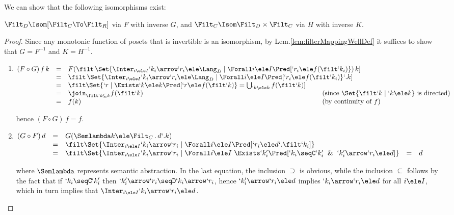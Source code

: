 \documentclass{lmcs}
\begin{document}
We can show that the following isomorphisms exist: 

 \begin{thm} \label{iso-theorem}
$\Filt_D \Isom [\Filt_C\To\Filt_R]$ via $F$ with inverse $G$, and $\Filt_C \Isom \Filt_D \times \Filt_C$ via $H$ with inverse $K$.
 \end{thm}

 \begin{proof} Since any monotonic function of posets that is invertible is an isomorphism,
by Lem.\skp\ref{lem:filterMappingWellDef} it suffices to show that $G = F^{-1}$ and $K = H^{-1}$.

 \begin{enumerate} \itemsep 2pt

 \item
 $ \begin{array}[t]{@{}lll@{\kern-2cm}l}
(F \circ G)\,f\,k 
	&=& 
F (\filt\,\Set{\Inter_{i \ele I} `k_i\arrow `r_i \ele \Lang_D \mid \Forall i \ele I \Pred[ `r_i \ele f(\filt `k_i) }) \, k ] \\
	&=& 
\filt\,\Set{\Inter_{i \ele I} `k_i\arrow `r_i \ele \Lang_D \mid \Forall i \ele I \Pred [ `r_i \ele f(\filt `k_i) } `.k ] \\ 
	&=& 
\filt\Set{`r \mid \Exists `k \ele k \Pred [ `r \ele f(\filt `k)} = \bigcup_{`k \ele k } f(\filt`k) ] \\ 
	&=& 
\join_{\filt`k \subseteq k } f(\filt`k) & (\textrm{since }\Set{\filt`k \mid `k \ele k } \textrm{ is directed}) \\ 
	&=& 
f(k) & (\textrm{by continuity of }f)
 \end{array} $

\noindent
hence $(F \circ G)\,f = f$.

 \item
 $ \begin{array}[t]{@{}lllll}
(G \circ F) \, d 
	& = & 
G(\Semlambda k \ele \Filt_C \, . \, d`.k) \\ 
	& = & 
\filt \Set{\Inter_{i \ele I} `k_i\arrow `r_i \mid \Forall i \ele I \Pred [ `r_i \ele d `.\filt `k_i ] } \\ 
	& = & 
\filt \Set{\Inter_{i \ele I} `k_i\arrow `r_i \mid \Forall i \ele I ~ \Exists `k'_i \Pred [`k_i \seqC `k'_i \And `k'_i\arrow `r_i \ele d ] } %
	& = & 
d
 \end{array} $

\noindent
where $\Semlambda$ represents semantic abstraction.
In the last equation, the inclusion $\supseteq$ is obvious, while the inclusion $\subseteq$ follows by the fact that if $`k_i \seqC `k'_i$ then $`k'_i\arrow `r_i \seqD `k_i\arrow `r_i$, hence $`k'_i\arrow `r_i \ele d$ implies $`k_i\arrow `r_i \ele d$ for all $i \ele I$, which in turn implies that $\Inter_{i \ele I} `k_i\arrow `r_i \ele d$.


\end{enumerate}
\end{proof}
\end{document}
